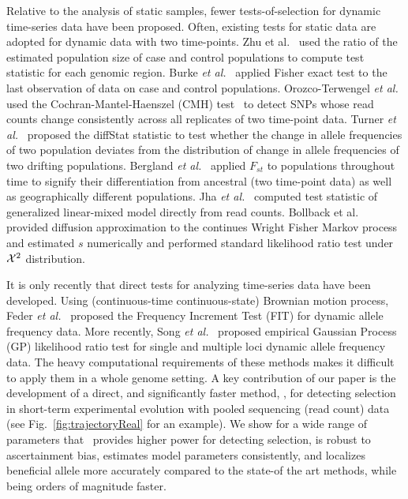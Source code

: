 \documentclass[11pt]{article}
\def\comale{\text{{\sc Comale}}}
\begin{document}
Relative to the analysis of static samples, fewer tests-of-selection
for dynamic time-series data have been proposed. Often, existing tests
for static data are adopted for dynamic data with two time-points. Zhu
et al.~\cite{zhou2011experimental} used the ratio of the estimated
population size of case and control populations to compute test
statistic for each genomic region. Burke \emph{et
  al.}~\cite{burke2010genome} applied Fisher exact test to the last
observation of data on case and control populations.  Orozco-Terwengel
\emph{et al.}~\cite{orozco2012adaptation} used the
Cochran-Mantel-Haenszel (CMH) test~\cite{agresti2011categorical} to
detect SNPs whose read counts change consistently across all
replicates of two time-point data.  Turner \emph{et
  al.}~\cite{turner2011population} proposed the diffStat statistic to
test whether the change in allele frequencies of two population
deviates from the distribution of change in allele frequencies of two
drifting populations.  Bergland \emph{et
  al.}~\cite{bergland2014genomic} applied $F_{st}$ to populations
throughout time to signify their differentiation from ancestral (two
time-point data) as well as geographically different populations. Jha
\emph{et al.}~\cite{jha2015whole} computed test statistic of
generalized linear-mixed model directly from read counts.  Bollback et
al.~\cite{bollback2008estimation} provided diffusion approximation to
the continues Wright Fisher Markov process and estimated $s$
numerically and performed standard likelihood ratio test under ${\cal X}^2$
distribution.

It is only recently that direct tests for analyzing time-series data
have been developed. Using (continuous-time continuous-state) Brownian
motion process, Feder \emph{et al.}~\cite{feder2014Identifying}
proposed the Frequency Increment Test (FIT) for dynamic allele
frequency data. More recently, Song \emph{et
  al.}~\cite{Terhorst2015Multi} proposed empirical Gaussian Process
(GP) likelihood ratio test for single and multiple loci dynamic allele
frequency data. The heavy computational requirements of these methods
makes it difficult to apply them in a whole genome setting.  A key
contribution of our paper is the development of a direct, and
significantly faster method, \comale, for detecting selection in
short-term experimental evolution with pooled sequencing (read count)
data (see Fig.~\ref{fig:trajectoryReal} for an example).  We show for a wide 
range of parameters that \comale\ provides
higher power for detecting selection, is robust to ascertainment bias,
estimates model parameters consistently, and localizes beneficial
allele more accurately compared to the state-of the art methods, while
being orders of magnitude faster.
\end{document}

